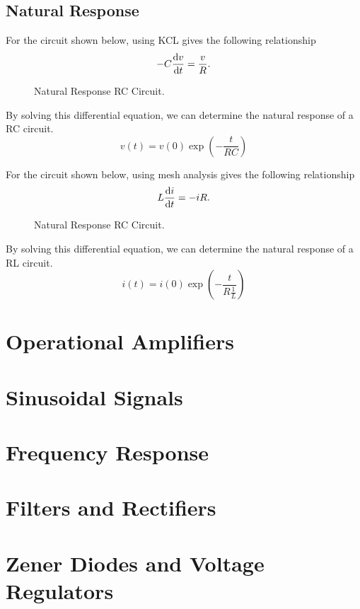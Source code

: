 \documentclass{article}
\begin{document}
\subsection{Natural Response}
\begin{definition}
    For the circuit shown below, using KCL gives the following relationship
    \begin{equation*}
        -C \dv{v}{t} = \frac{v}{R}.
    \end{equation*}
    \begin{figure}[H]
        \centering
        \caption{Natural Response RC Circuit.}
    \end{figure}
    By solving this differential equation, we can determine the natural response of a 
    RC circuit.
    \begin{equation*}
        v(t) = v(0)\exp{\left( -\frac{t}{RC} \right)}
    \end{equation*} 
\end{definition}
\begin{definition}
    For the circuit shown below, using mesh analysis gives the following relationship
    \begin{equation*}
        L \dv{i}{t} = -iR.
    \end{equation*}
    \begin{figure}[H]
        \centering
        \caption{Natural Response RC Circuit.}
    \end{figure}
    By solving this differential equation, we can determine the natural response of a 
    RL circuit.
    \begin{equation*}
        i(t) = i(0)\exp{\left( -\frac{t}{R\frac{1}{L}} \right)}
    \end{equation*} 
\end{definition}
\newpage
\section{Operational Amplifiers}
\newpage
\section{Sinusoidal Signals}
\newpage
\section{Frequency Response}
\newpage
\section{Filters and Rectifiers}
\newpage
\section{Zener Diodes and Voltage Regulators}
\newpage
\end{document}

